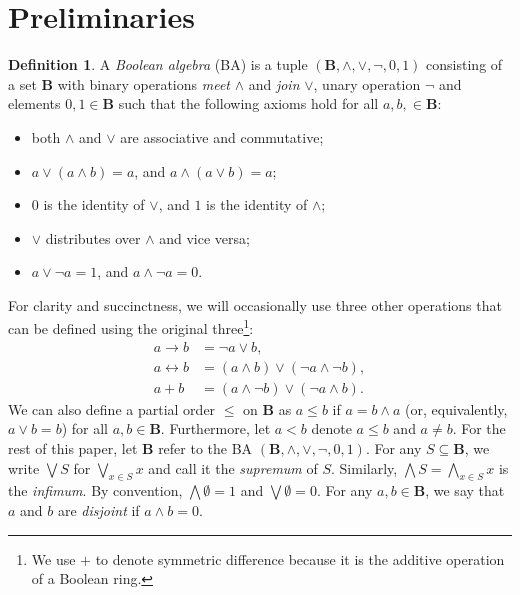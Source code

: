 \documentclass{article}
\theoremstyle{definition}
\newtheorem{definition}[theorem]{Definition}
\theoremstyle{remark}
\begin{document}
\section{Preliminaries}

\begin{definition} \label{def:ba}
  A \emph{Boolean algebra} (BA) is a tuple $(\mathbf{B}, \land, \lor, \neg, 0,
  1)$ consisting of a set $\mathbf{B}$ with binary operations \emph{meet}
  $\land$ and \emph{join} $\lor$, unary operation $\neg$ and elements $0, 1 \in
  \mathbf{B}$ such that the following axioms hold for all $a, b, \in
  \mathbf{B}$:
  \begin{itemize}
  \item both $\land$ and $\lor$ are associative and commutative;
  \item $a \lor (a \land b) = a$, and $a \land (a \lor b) = a$;
  \item $0$ is the identity of $\lor$, and $1$ is the identity of $\land$;
  \item $\lor$ distributes over $\land$ and vice versa;
  \item $a \lor \neg a = 1$, and $a \land \neg a = 0$.
  \end{itemize}
\end{definition}

For clarity and succinctness, we will occasionally use three other operations
that can be defined using the original three\footnote{We use $+$ to denote
  symmetric difference because it is the additive operation of a Boolean ring.}:
\begin{align*}
  a \to b &= \neg a \lor b, \\
  a \leftrightarrow b &= (a \land b) \lor (\neg a \land \neg b), \\
  a + b &= (a \land \neg b) \lor (\neg a \land b).
\end{align*}
We can also define a partial order $\le$ on $\mathbf{B}$ as $a \le b$ if $a = b
\land a$ (or, equivalently, $a \lor b = b$) for all $a, b \in \mathbf{B}$.
Furthermore, let $a < b$ denote $a \le b$ and $a \ne b$. For the rest of this
paper, let $\mathbf{B}$ refer to the BA $(\mathbf{B}, \land, \lor, \neg, 0, 1)$.
For any $S \subseteq \mathbf{B}$, we write $\bigvee S$ for $\bigvee_{x \in S} x$
and call it the \emph{supremum} of $S$. Similarly, $\bigwedge S = \bigwedge_{x
  \in S} x$ is the \emph{infimum}. By convention, $\bigwedge \emptyset = 1$ and
$\bigvee \emptyset = 0$. For any $a, b \in \mathbf{B}$, we say that $a$ and $b$
are \emph{disjoint} if $a \land b = 0$.
\end{document}

